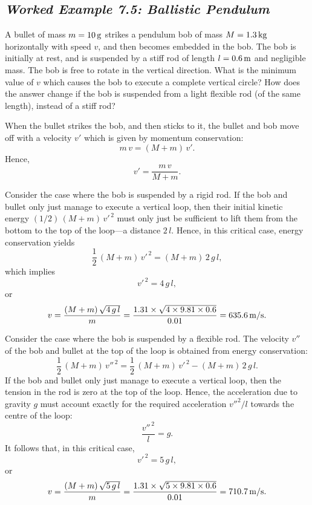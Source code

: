 \subsection*{\em Worked Example 7.5: Ballistic Pendulum} 
 A bullet of mass $m=10\,{\rm g}$ strikes a pendulum bob
of mass $M=1.3\,{\rm kg}$ horizontally with speed $v$,  and then becomes embedded in the bob. The bob
is initially at rest, and is suspended by a stiff rod of length $l=0.6\,{\rm m}$
and negligible mass. The bob is free to rotate in the vertical direction.
What is the minimum value of $v$ which causes the bob to execute a
complete vertical circle? How does the answer change if the bob is suspended from 
a light flexible rod (of the same length), instead of a stiff rod?

 When the bullet strikes the bob, and then sticks to it, the bullet and
bob move off with a velocity  $v'$ which is given by momentum conservation:
$$
m\,v = (M+m)\,v'.
$$
Hence,
$$
v' = \frac{m\,v}{M+m}.
$$

Consider the case where the bob is suspended by a rigid rod.
If the bob and bullet  only just manage to execute a vertical loop, then their initial kinetic
energy $(1/2)\,(M+m)\,{v'}^{\,2}$ must only just be sufficient to lift them from the bottom 
to the top of the loop---a distance $2\,l$. Hence, in this critical case,
energy conservation yields
$$
\frac{1}{2}\,(M+m)\,{v'}^{\,2} = (M+m)\,2\,g\,l,
$$
which implies
$$
{v'}^{\,2} = 4\,g\,l,
$$
or
$$
v =  \frac{ (M+m)\,\sqrt{4\,g\,l} }{ m }  = 
\frac{1.31\times\sqrt{4\times 9.81\times 0.6}}{0.01}
=635.6\,{\rm m/s}.
$$

Consider the case where the bob is suspended by a flexible rod.
The velocity $v''$ of the bob and bullet at the top of the loop is obtained from energy
conservation:
$$
\frac{1}{2}\,(M+m)\,{v''}^{\,2} = \frac{1}{2}\,(M+m)\,{v'}^{\,2} - (M+m)\,2\,g\,l.
$$
If the bob and bullet  only just manage to execute a vertical loop, then the tension
in the rod is zero at the top of the loop. Hence, the acceleration due to
gravity $g$ must account exactly for the required acceleration ${v''}^2/l$ towards the centre of the loop:
$$
\frac{{v''}^{\,2}}{l} = g.
$$
It follows that, in this critical case,
$$
{v'}^{\,2} = 5\,g\,l,
$$
or
$$
v =  \frac{(M+m)\,\sqrt{5\, g\,l} }{ m }  = 
\frac{1.31\times\sqrt{5\times 9.81\times 0.6}}{0.01}
=710.7\,{\rm m/s}.
$$
